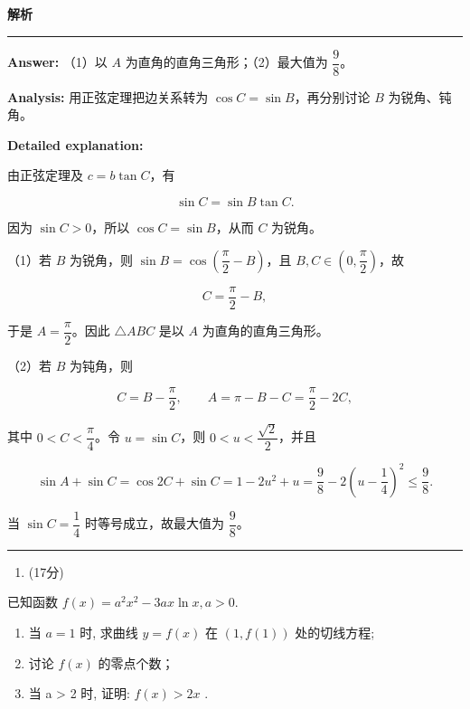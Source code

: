 \documentclass[UTF8,12pt,a4paper]{ctexart}
\renewcommand{\labelenumi}{\arabic{enumi}.}
\newenvironment{examSolutionBox}{%
  \par\medskip\begingroup
  \setlength{\leftskip}{1.0em}\setlength{\rightskip}{0.9em}%
  \noindent\textcolor{SolutionTeal}{\bfseries\large 解析}\par
  \smallskip\noindent\textcolor{SolutionRule}{\rule{\dimexpr\linewidth-\leftskip-\rightskip\relax}{0.8pt}}\par
  \smallskip\color{SolutionInk}%
}{%
  \par\smallskip\noindent\textcolor{SolutionRule}{\rule{\dimexpr\linewidth-\leftskip-\rightskip\relax}{0.8pt}}\par
  \endgroup\medskip
}
\providecommand{\tightlist}{%
  \setlength{\itemsep}{0pt}\setlength{\parskip}{0pt}}
\begin{document}
\begin{examSolutionBox}

\textbf{Answer:} （1）以 \(A\) 为直角的直角三角形；（2）最大值为 \(\dfrac98\)。

\textbf{Analysis:} 用正弦定理把边关系转为 \(\cos C=\sin B\)，再分别讨论 \(B\) 为锐角、钝角。

\textbf{Detailed explanation:}

由正弦定理及 \(c=b\tan C\)，有

\[
   \sin C=\sin B\tan C.
   \]

因为 \(\sin C>0\)，所以 \(\cos C=\sin B\)，从而 \(C\) 为锐角。

（1）若 \(B\) 为锐角，则 \(\sin B=\cos\left(\dfrac\pi2-B\right)\)，且 \(B,C\in\left(0,\dfrac\pi2\right)\)，故

\[
   C=\dfrac\pi2-B,
   \]

于是 \(A=\dfrac\pi2\)。因此 \(\triangle ABC\) 是以 \(A\) 为直角的直角三角形。

（2）若 \(B\) 为钝角，则

\[
   C=B-\dfrac\pi2,
   \qquad
   A=\pi-B-C=\dfrac\pi2-2C,
   \]

其中 \(0<C<\dfrac\pi4\)。令 \(u=\sin C\)，则 \(0<u<\dfrac{\sqrt2}{2}\)，并且

\[
   \sin A+\sin C=\cos2C+\sin C
   =1-2u^2+u
   =\dfrac98-2\left(u-\dfrac14\right)^2\le\dfrac98.
   \]

当 \(\sin C=\dfrac14\) 时等号成立，故最大值为 \(\dfrac98\)。

\end{examSolutionBox}

\begin{enumerate}
\def\labelenumi{\arabic{enumi}.}
\setcounter{enumi}{17}
\tightlist
\item
  (17分)
\end{enumerate}

已知函数 \(f(x)=a^{2}x^{2}-3ax\ln x,a>0.\)

\begin{enumerate}
\def\labelenumi{(\arabic{enumi})}
\item
  当 \(a = 1\) 时, 求曲线 \(y = f(x)\) 在 \((1, f(1))\) 处的切线方程;
\item
  讨论 \(f(x)\) 的零点个数；
\item
  当 a \textgreater{} 2 时, 证明: \(f(x) > 2x\) .
\end{enumerate}
\end{document}
